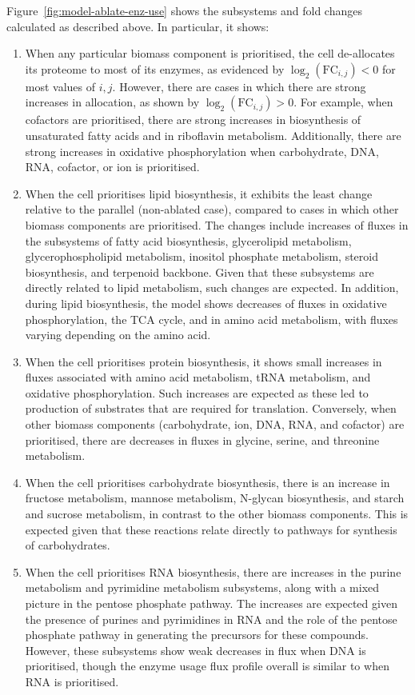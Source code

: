 Figure~\ref{fig:model-ablate-enz-use} shows the subsystems and fold changes calculated as described above.
In particular, it shows:

\begin{enumerate}
  \item When any particular biomass component is prioritised, the cell de-allocates its proteome to most of its enzymes, as evidenced by $\log_{2}(\mathrm{FC}_{i,j}) < 0$ for most values of $i, j$.
        However, there are cases in which there are strong increases in allocation, as shown by $\log_{2}(\mathrm{FC}_{i,j}) > 0$.
        For example, when cofactors are prioritised, there are strong increases in biosynthesis of unsaturated fatty acids and in riboflavin metabolism.
        Additionally, there are strong increases in oxidative phosphorylation when carbohydrate, DNA, RNA, cofactor, or ion is prioritised.
  \item When the cell prioritises lipid biosynthesis, it exhibits the least change relative to the parallel (non-ablated case), compared to cases in which other biomass components are prioritised.
        The changes include increases of fluxes in the subsystems of fatty acid biosynthesis, glycerolipid metabolism, glycerophospholipid metabolism, inositol phosphate metabolism, steroid biosynthesis, and terpenoid backbone.
        Given that these subsystems are directly related to lipid metabolism, such changes are expected.
        In addition, during lipid biosynthesis, the model shows decreases of fluxes in oxidative phosphorylation, the TCA cycle, and in amino acid metabolism, with fluxes varying depending on the amino acid.
  \item When the cell prioritises protein biosynthesis, it shows small increases in fluxes associated with amino acid metabolism, tRNA metabolism, and oxidative phosphorylation.
        Such increases are expected as these led to production of substrates that are required for translation.
        Conversely, when other biomass components (carbohydrate, ion, DNA, RNA, and cofactor) are prioritised, there are decreases in fluxes in glycine, serine, and threonine metabolism.
  \item When the cell prioritises carbohydrate biosynthesis, there is an increase in fructose metabolism, mannose metabolism, N-glycan biosynthesis, and starch and sucrose metabolism, in contrast to the other biomass components.
        This is expected given that these reactions relate directly to pathways for synthesis of carbohydrates.
  \item When the cell prioritises RNA biosynthesis, there are increases in the purine metabolism and pyrimidine metabolism subsystems, along with a mixed picture in the pentose phosphate pathway.
        The increases are expected given the presence of purines and pyrimidines in RNA and the role of the pentose phosphate pathway in generating the precursors for these compounds.
        However, these subsystems show weak decreases in flux when DNA is prioritised, though the enzyme usage flux profile overall is similar to when RNA is prioritised.
\end{enumerate}

